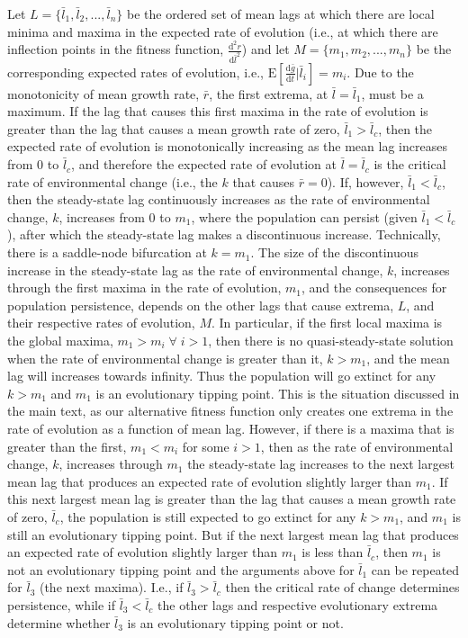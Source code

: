 \documentclass[12pt,letterpaper]{article} %
\begin{document}
Let $L=\{\bar{l}_1,\bar{l}_2,...,\bar{l}_n\}$ be the ordered set of mean lags at which there are local minima and maxima in the expected rate of evolution (i.e., at which there are inflection points in the fitness function, $\frac{\mathrm{d}^2 r}{\mathrm{d} \bar{l}^2}$) and let $M=\{m_1, m_2, ..., m_n\}$ be the corresponding expected rates of evolution, i.e., $\mathrm{E}[\frac{\mathrm{d} \bar{g}}{\mathrm{d} t}|\bar{l}_i] = m_i$.
Due to the monotonicity of mean growth rate, $\bar{r}$, the first extrema, at $\bar{l}=\bar{l}_1$, must be a maximum.
If the lag that causes this first maxima in the rate of evolution is greater than the lag that causes a mean growth rate of zero, $\bar{l}_1>\bar{l}_c$, then the expected rate of evolution is monotonically increasing as the mean lag increases from 0 to $\bar{l}_c$, and therefore the expected rate of evolution at $\bar{l}=\bar{l}_c$ is the critical rate of environmental change (i.e., the $k$ that causes $\bar{r}=0$).
If, however, $\bar{l}_1<\bar{l}_c$, then the steady-state lag continuously increases as the rate of environmental change, $k$, increases from 0 to $m_1$, where the population can persist (given $\bar{l}_1<\bar{l}_c$), after which the steady-state lag makes a discontinuous increase.
Technically, there is a saddle-node bifurcation at $k = m_1$.
The size of the discontinuous increase in the steady-state lag as the rate of environmental change, $k$, increases through the first maxima in the rate of evolution, $m_1$, and the consequences for population persistence, depends on the other lags that cause extrema, $L$, and their respective rates of evolution, $M$.
In particular, if the first local maxima is the global maxima, $m_1>m_i\;\forall\;i>1$, then there is no quasi-steady-state solution when the rate of environmental change is greater than it, $k>m_1$, and the mean lag will increases towards infinity.
Thus the population will go extinct for any $k>m_1$ and $m_1$ is an evolutionary tipping point.
This is the situation discussed in the main text, as our alternative fitness function only creates one extrema in the rate of evolution as a function of mean lag.
However, if there is a maxima that is greater than the first, $m_1<m_i$ for some $i>1$, then as the rate of environmental change, $k$, increases through $m_1$ the steady-state lag increases to the next largest mean lag that produces an expected rate of evolution slightly larger than $m_1$.
If this next largest mean lag is greater than the lag that causes a mean growth rate of zero, $\bar{l}_c$, the population is still expected to go extinct for any $k>m_1$, and $m_1$ is still an evolutionary tipping point.
But if the next largest mean lag that produces an expected rate of evolution slightly larger than $m_1$ is less than $\bar{l}_c$, then $m_1$ is not an evolutionary tipping point and the arguments above for $\bar{l}_1$ can be repeated for $\bar{l}_3$ (the next maxima).
I.e., if $\bar{l}_3>\bar{l}_c$ then the critical rate of change determines persistence, while if $\bar{l}_3<\bar{l}_c$ the other lags and respective evolutionary extrema determine whether $\bar{l}_3$ is an evolutionary tipping point or not. 
\end{document}
